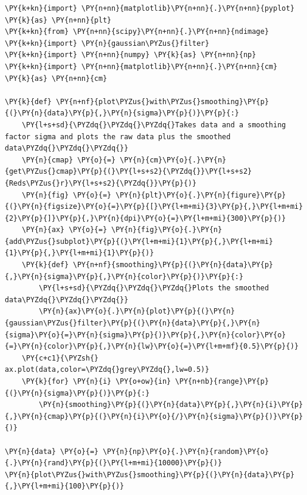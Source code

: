     \begin{tcolorbox}[breakable, size=fbox, boxrule=1pt, pad at break*=1mm,colback=cellbackground, colframe=cellborder]
\begin{Verbatim}[commandchars=\\\{\}]
\PY{k+kn}{import} \PY{n+nn}{matplotlib}\PY{n+nn}{.}\PY{n+nn}{pyplot} \PY{k}{as} \PY{n+nn}{plt}
\PY{k+kn}{from} \PY{n+nn}{scipy}\PY{n+nn}{.}\PY{n+nn}{ndimage} \PY{k+kn}{import} \PY{n}{gaussian\PYZus{}filter}
\PY{k+kn}{import} \PY{n+nn}{numpy} \PY{k}{as} \PY{n+nn}{np}
\PY{k+kn}{import} \PY{n+nn}{matplotlib}\PY{n+nn}{.}\PY{n+nn}{cm} \PY{k}{as} \PY{n+nn}{cm}

\PY{k}{def} \PY{n+nf}{plot\PYZus{}with\PYZus{}smoothing}\PY{p}{(}\PY{n}{data}\PY{p}{,}\PY{n}{sigma}\PY{p}{)}\PY{p}{:}
    \PY{l+s+sd}{\PYZdq{}\PYZdq{}\PYZdq{}Takes data and a smoothing factor sigma and plots the raw data plus the smoothed data\PYZdq{}\PYZdq{}\PYZdq{}}
    \PY{n}{cmap} \PY{o}{=} \PY{n}{cm}\PY{o}{.}\PY{n}{get\PYZus{}cmap}\PY{p}{(}\PY{l+s+s2}{\PYZdq{}}\PY{l+s+s2}{Reds\PYZus{}r}\PY{l+s+s2}{\PYZdq{}}\PY{p}{)}
    \PY{n}{fig} \PY{o}{=} \PY{n}{plt}\PY{o}{.}\PY{n}{figure}\PY{p}{(}\PY{n}{figsize}\PY{o}{=}\PY{p}{[}\PY{l+m+mi}{3}\PY{p}{,}\PY{l+m+mi}{2}\PY{p}{]}\PY{p}{,}\PY{n}{dpi}\PY{o}{=}\PY{l+m+mi}{300}\PY{p}{)}
    \PY{n}{ax} \PY{o}{=} \PY{n}{fig}\PY{o}{.}\PY{n}{add\PYZus{}subplot}\PY{p}{(}\PY{l+m+mi}{1}\PY{p}{,}\PY{l+m+mi}{1}\PY{p}{,}\PY{l+m+mi}{1}\PY{p}{)}
    \PY{k}{def} \PY{n+nf}{smoothing}\PY{p}{(}\PY{n}{data}\PY{p}{,}\PY{n}{sigma}\PY{p}{,}\PY{n}{color}\PY{p}{)}\PY{p}{:}
        \PY{l+s+sd}{\PYZdq{}\PYZdq{}\PYZdq{}Plots the smoothed data\PYZdq{}\PYZdq{}\PYZdq{}}
        \PY{n}{ax}\PY{o}{.}\PY{n}{plot}\PY{p}{(}\PY{n}{gaussian\PYZus{}filter}\PY{p}{(}\PY{n}{data}\PY{p}{,}\PY{n}{sigma}\PY{o}{=}\PY{n}{sigma}\PY{p}{)}\PY{p}{,}\PY{n}{color}\PY{o}{=}\PY{n}{color}\PY{p}{,}\PY{n}{lw}\PY{o}{=}\PY{l+m+mf}{0.5}\PY{p}{)}
    \PY{c+c1}{\PYZsh{} ax.plot(data,color=\PYZdq{}grey\PYZdq{},lw=0.5)}
    \PY{k}{for} \PY{n}{i} \PY{o+ow}{in} \PY{n+nb}{range}\PY{p}{(}\PY{n}{sigma}\PY{p}{)}\PY{p}{:}
        \PY{n}{smoothing}\PY{p}{(}\PY{n}{data}\PY{p}{,}\PY{n}{i}\PY{p}{,}\PY{n}{cmap}\PY{p}{(}\PY{n}{i}\PY{o}{/}\PY{n}{sigma}\PY{p}{)}\PY{p}{)}

\PY{n}{data} \PY{o}{=} \PY{n}{np}\PY{o}{.}\PY{n}{random}\PY{o}{.}\PY{n}{rand}\PY{p}{(}\PY{l+m+mi}{10000}\PY{p}{)}
\PY{n}{plot\PYZus{}with\PYZus{}smoothing}\PY{p}{(}\PY{n}{data}\PY{p}{,}\PY{l+m+mi}{100}\PY{p}{)}
\end{Verbatim}
\end{tcolorbox}

